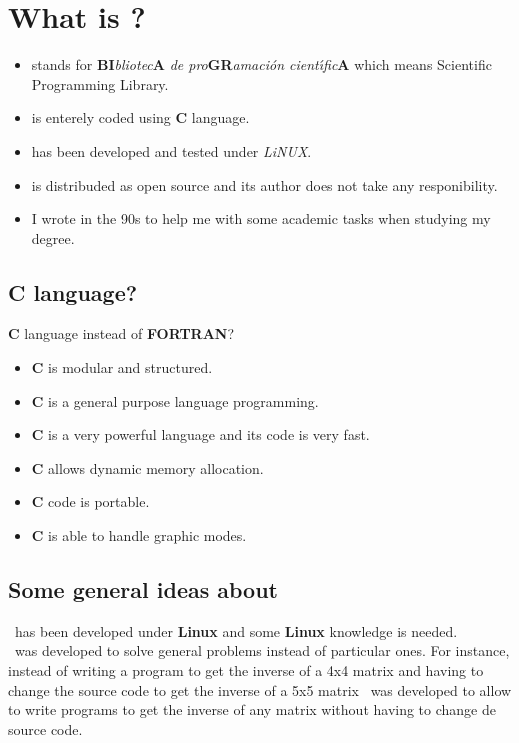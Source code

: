 %
%

\chapter{What is \BI?}

\begin{itemize}

\item \BI stands for \textbf{BI}\emph{bliotec}\textbf{A} \emph{de pro}\textbf{GR}\emph{amaci\'on cient\'{\i}fic}\textbf{A} which means Scientific Programming Library.
\item \BI is enterely coded using \textbf{C} language.
\item \BI has been developed and tested under \emph{LiNUX}.
\item \BI is distribuded as open source and its author does not take any responibility.
\item I wrote \BI in the 90s to help me with some academic tasks when studying my degree.

\end{itemize}

\section{C language?}

\textbf{C} language instead of \textbf{FORTRAN}?
%
\begin{itemize}
\item \textbf{C} is modular and structured.
\item \textbf{C} is a general purpose language programming.
\item \textbf{C} is a very powerful language and its code is very fast.
\item \textbf{C} allows dynamic memory allocation.
\item \textbf{C} code is portable.
\item \textbf{C} is able to handle graphic modes. 
\end{itemize}

\section{Some general ideas about \BI}

\BI\ has been developed under \textbf{Linux} and some \textbf{Linux} knowledge is needed.\\

\BI\ was developed to solve general problems instead of particular ones. For instance, instead of writing a program to get the inverse of a 4x4 matrix and having to change the source code to get the inverse of a 5x5 matrix \BI\ was developed to allow to write programs to get the inverse of any matrix without having to change de source code.\\

